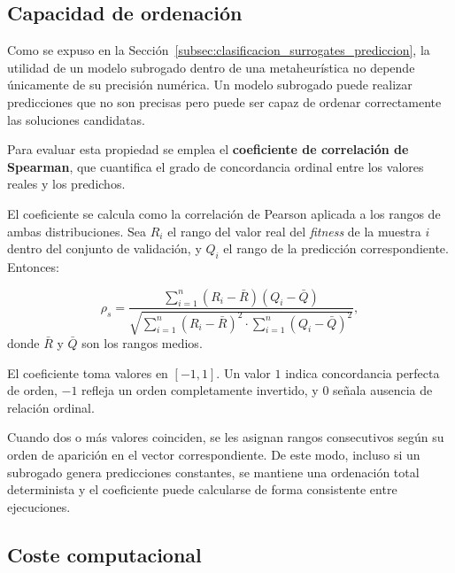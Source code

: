 \subsection{Capacidad de ordenación}

Como se expuso en la
Sección~\ref{subsec:clasificacion_surrogates_prediccion}, la utilidad de un
modelo subrogado dentro de una metaheurística no depende únicamente de su
precisión numérica. Un modelo subrogado puede realizar predicciones que no son precisas pero puede ser capaz de ordenar correctamente las soluciones candidatas.

Para evaluar esta propiedad se
emplea el \textbf{coeficiente de correlación de Spearman}, que cuantifica el grado de concordancia ordinal
entre los valores reales y los predichos.

El coeficiente se calcula como la correlación de Pearson aplicada a los rangos de ambas distribuciones. Sea \(R_i\) el rango del valor real del \textit{fitness} de la muestra \(i\) dentro del conjunto de validación, y \(Q_i\) el rango de la predicción correspondiente. Entonces:

\begin{equation}
    \rho_s
    =
    \frac{
        \displaystyle\sum_{i=1}^{n}
        (R_i - \bar{R})(Q_i - \bar{Q})
    }{
        \sqrt{
            \displaystyle\sum_{i=1}^{n}(R_i - \bar{R})^2
            \cdot
            \displaystyle\sum_{i=1}^{n}(Q_i - \bar{Q})^2
        }
    },
    \label{eq:spearman}
\end{equation}
donde \(\bar{R}\) y \(\bar{Q}\) son los rangos medios.

El coeficiente toma valores en \([-1, 1]\). Un valor \(1\) indica concordancia perfecta de orden, \(-1\) refleja un orden completamente invertido, y \(0\) señala ausencia de relación ordinal.

Cuando dos o más valores coinciden, se les asignan rangos consecutivos según
su orden de aparición en el vector correspondiente. De este modo, incluso si
un subrogado genera predicciones constantes, se mantiene una ordenación total
determinista y el coeficiente puede calcularse de forma consistente entre
ejecuciones.


\subsection{Coste computacional}

